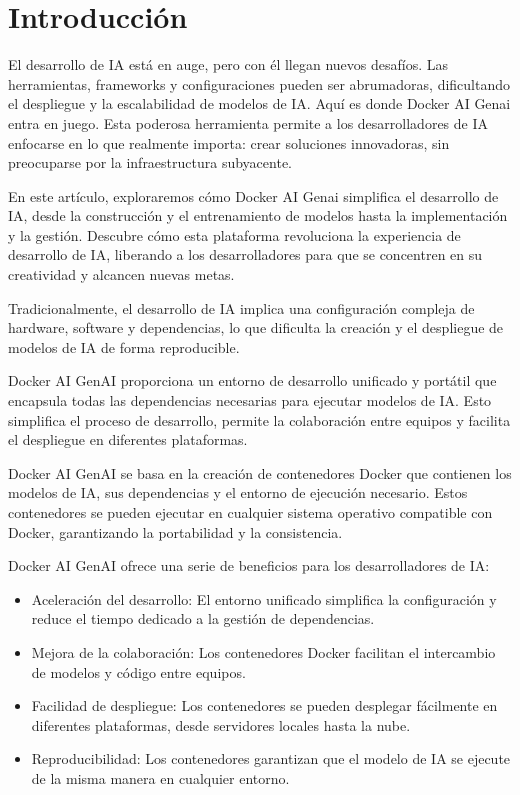 \documentclass{article}
\begin{document}
\section{Introducción}
\label{sec:introduction}

El desarrollo de IA está en auge, pero con él llegan nuevos desafíos. Las herramientas, frameworks y configuraciones pueden ser abrumadoras, dificultando el despliegue y la escalabilidad de modelos de IA. Aquí es donde Docker AI Genai entra en juego. Esta poderosa herramienta permite a los desarrolladores de IA enfocarse en lo que realmente importa: crear soluciones innovadoras, sin preocuparse por la infraestructura subyacente.

En este artículo, exploraremos cómo Docker AI Genai simplifica el desarrollo de IA, desde la construcción y el entrenamiento de modelos hasta la implementación y la gestión. Descubre cómo esta plataforma revoluciona la experiencia de desarrollo de IA, liberando a los desarrolladores para que se concentren en su creatividad y alcancen nuevas metas.

Tradicionalmente, el desarrollo de IA implica una configuración compleja de hardware, software y dependencias, lo que dificulta la creación y el despliegue de modelos de IA de forma reproducible.

Docker AI GenAI proporciona un entorno de desarrollo unificado y portátil que encapsula todas las dependencias necesarias para ejecutar modelos de IA. Esto simplifica el proceso de desarrollo, permite la colaboración entre equipos y facilita el despliegue en diferentes plataformas.

Docker AI GenAI se basa en la creación de contenedores Docker que contienen los modelos de IA, sus dependencias y el entorno de ejecución necesario. Estos contenedores se pueden ejecutar en cualquier sistema operativo compatible con Docker, garantizando la portabilidad y la consistencia.

Docker AI GenAI ofrece una serie de beneficios para los desarrolladores de IA:

\begin{itemize}
    \item Aceleración del desarrollo: El entorno unificado simplifica la configuración y reduce el tiempo dedicado a la gestión de dependencias.
    \item Mejora de la colaboración: Los contenedores Docker facilitan el intercambio de modelos y código entre equipos.
    \item Facilidad de despliegue: Los contenedores se pueden desplegar fácilmente en diferentes plataformas, desde servidores locales hasta la nube.
    \item Reproducibilidad: Los contenedores garantizan que el modelo de IA se ejecute de la misma manera en cualquier entorno.
\end{itemize}
\end{document}

